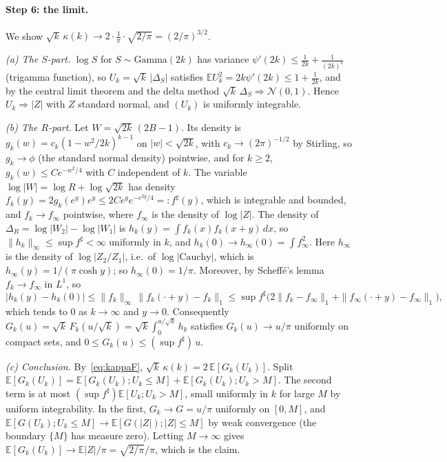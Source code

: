 \documentclass[a4paper,onecolumn,11pt,unpublished,nopdfoutputerror]{quantumarticle}
\theoremstyle{definition}
\newcommand{\E}{\mathbb{E}}
\begin{document}
\paragraph{Step 6: the limit.}
We show $\sqrt k\,\kappa(k)\to2\cdot\frac1\pi\cdot\sqrt{2/\pi}=(2/\pi)^{3/2}$.

\emph{(a) The $S$-part.} $\log S$ for $S\sim\mathrm{Gamma}(2k)$ has variance $\psi'(2k)\le\frac1{2k}+\frac1{(2k)^2}$
(trigamma function), so $U_k=\sqrt k\,|\Delta_S|$ satisfies $\E U_k^2=2k\psi'(2k)\le1+\frac1{2k}$, and by the
central limit theorem and the delta method $\sqrt{k}\,\Delta_S\Rightarrow\mathcal N(0,1)$. Hence
$U_k\Rightarrow|Z|$ with $Z$ standard normal, and $(U_k)$ is uniformly integrable.

\emph{(b) The $R$-part.} Let $W=\sqrt{2k}\,(2B-1)$. Its density is $g_k(w)=c_k(1-w^2/2k)^{k-1}$ on
$|w|<\sqrt{2k}$, with $c_k\to(2\pi)^{-1/2}$ by Stirling, so $g_k\to\phi$ (the standard normal density) pointwise,
and for $k\ge2$, $g_k(w)\le C e^{-w^2/4}$ with $C$ independent of $k$. The variable $\log|W|=\log R+\log\sqrt{2k}$
has density $f_k(y)=2g_k(e^y)e^y\le2Ce^{y}e^{-e^{2y}/4}=:f^\sharp(y)$, which is integrable and bounded, and
$f_k\to f_\infty$ pointwise, where $f_\infty$ is the density of $\log|Z|$. The density of $\Delta_R=\log|W_2|-\log|W_1|$
is $h_k(y)=\int f_k(x)f_k(x+y)\,dx$, so $\|h_k\|_\infty\le\sup f^\sharp<\infty$ uniformly in $k$, and $h_k(0)\to
h_\infty(0)=\int f_\infty^2$. Here $h_\infty$ is the density of $\log|Z_2/Z_1|$, i.e.\ of $\log|\mathrm{Cauchy}|$,
which is $h_\infty(y)=1/(\pi\cosh y)$; so $h_\infty(0)=1/\pi$. Moreover, by Scheff\'e's lemma $f_k\to f_\infty$ in
$L^1$, so
\[
  |h_k(y)-h_k(0)|\le\|f_k\|_\infty\,\|f_k(\cdot+y)-f_k\|_1\le\sup f^\sharp\bigl(2\|f_k-f_\infty\|_1+\|f_\infty(\cdot+y)-f_\infty\|_1\bigr),
\]
which tends to $0$ as $k\to\infty$ and $y\to0$. Consequently $G_k(u)=\sqrt k\,F_k(u/\sqrt k)=\sqrt
k\int_0^{u/\sqrt k}h_k$ satisfies $G_k(u)\to u/\pi$ uniformly on compact sets, and $0\le G_k(u)\le(\sup
f^\sharp)\,u$.

\emph{(c) Conclusion.} By~\eqref{eq:kappaF}, $\sqrt k\,\kappa(k)=2\,\E[G_k(U_k)]$. Split
$\E[G_k(U_k)]=\E[G_k(U_k);U_k\le M]+\E[G_k(U_k);U_k>M]$. The second term is at most $(\sup f^\sharp)\E[U_k;U_k>M]$,
small uniformly in $k$ for large $M$ by uniform integrability. In the first, $G_k\to G=u/\pi$ uniformly on
$[0,M]$, and $\E[G(U_k);U_k\le M]\to\E[G(|Z|);|Z|\le M]$ by weak convergence (the boundary $\{M\}$ has measure
zero). Letting $M\to\infty$ gives $\E[G_k(U_k)]\to\E|Z|/\pi=\sqrt{2/\pi}/\pi$, which is the claim.
\end{document}
